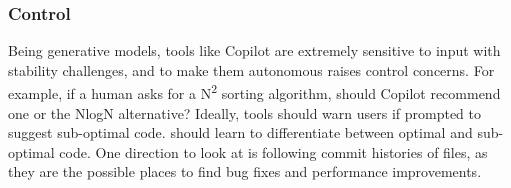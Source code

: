 \subsubsection{Control}
\label{control}
Being generative models, tools like Copilot are extremely sensitive to input with stability challenges, and to make them autonomous raises control concerns.
For example, if a human asks for a N\textsuperscript{2} sorting algorithm, should Copilot recommend one or the NlogN alternative? 
Ideally, tools should warn users if prompted to suggest sub-optimal code. 
\AISE{} should learn to differentiate between optimal and sub-optimal code. 
One direction to look at is following commit histories of files, as they are the possible places to find bug fixes and performance improvements.
